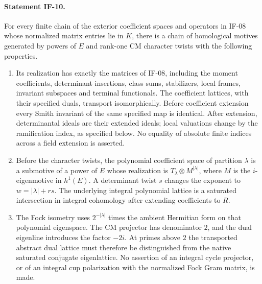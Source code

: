 \documentclass[11pt,a4paper]{article}
\theoremstyle{definition}
\theoremstyle{remark}
\begin{document}
\paragraph{Statement IF-10.}
For every finite chain of the exterior coefficient spaces and operators
in IF-08 whose normalized matrix entries lie in $K$, there is a chain
of homological motives generated by powers of $E$ and rank-one CM
character twists with the following properties.

\begin{enumerate}
\item Its realization has exactly the matrices of IF-08, including the
moment coefficients, determinant insertions, class sums, stabilizers,
local frames, invariant subspaces and terminal functionals. The
coefficient lattices, with their specified duals, transport isomorphically.
Before coefficient extension every Smith invariant of the same specified
map is identical. After extension, determinantal ideals are their extended
ideals; local valuations change by the ramification index, as specified
below. No equality of absolute finite indices across a field extension
is asserted.
\item Before the character twists, the polynomial coefficient space of
partition $\lambda$ is a submotive of a power of $E$ whose realization is
$T_\lambda\otimes M^{|\lambda|}$, where $M$ is the $i$-eigenmotive in
$h^1(E)$. A determinant twist $s$ changes the exponent to
$w=|\lambda|+rs$. The underlying integral polynomial lattice is a
saturated intersection in integral cohomology after extending coefficients
to $R$.
\item The Fock isometry uses $2^{-|\lambda|}$ times the ambient
Hermitian form on that polynomial eigenspace. The CM projector has
denominator $2$, and the dual eigenline introduces the factor $-2i$.
At primes above $2$ the transported abstract dual lattice must therefore
be distinguished from the native saturated conjugate eigenlattice.
No assertion of an integral cycle projector, or of an integral cup
polarization with the normalized Fock Gram matrix, is made.
\end{enumerate}
\end{document}
